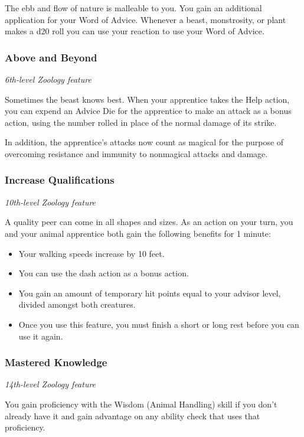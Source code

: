 \documentclass[letterpaper,openany,twoside,twocolumn]{book}
\begin{document}
	The ebb and flow of nature is malleable to you. You gain an additional application for your Word of Advice. Whenever a beast, monstrosity, or plant makes a d20 roll you can use your reaction to use your Word of Advice.
	
	\subsubsection*{Above and Beyond}
	\textnormal{\textit{6th-level Zoology feature}}
	
	Sometimes the beast knows best. When your apprentice takes the Help action, you can expend an Advice Die for the apprentice to make an attack as a bonus action, using the number rolled in place of the normal damage of its strike.
	
	In addition, the apprentice's attacks now count as magical for the purpose of overcoming resistance and immunity to nonmagical attacks and damage.
	
	\subsubsection*{Increase Qualifications}
	\textnormal{\textit{10th-level Zoology feature}}
	
	A quality peer can come in all shapes and sizes. As an action on your turn, you and your animal apprentice both gain the following benefits for 1 minute:
	
	\begin{itemize}
		\item Your walking speeds increase by 10 feet.
		\item You can use the dash action as a bonus action.
		\item You gain an amount of temporary hit points equal to your advisor level, divided amongst both creatures.
		\item Once you use this feature, you must finish a short or long rest before you can use it again.
	\end{itemize}
	
	\subsubsection*{Mastered Knowledge}
	\textnormal{\textit{14th-level Zoology feature}}
	
	You gain proficiency with the Wisdom (Animal Handling) skill if you don't already have it and gain advantage on any ability check that uses that proficiency.
	
\end{document}
